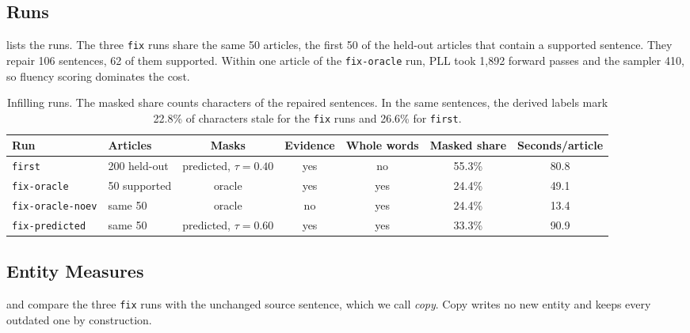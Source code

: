 \documentclass[]{paper}
\begin{document}
\subsection{Runs}

 lists the runs. The three \texttt{fix} runs share the same 50 articles, the first 50 of the held-out articles that contain a supported sentence. They repair 106 sentences, 62 of them supported. Within one article of the \texttt{fix-oracle} run, PLL took 1,892 forward passes and the sampler 410, so fluency scoring dominates the cost.

\begin{table}[t]
\caption{Infilling runs. The masked share counts characters of the repaired sentences. In the same sentences, the derived labels mark 22.8\% of characters stale for the \texttt{fix} runs and 26.6\% for \texttt{first}.}
\label{tab:runs}
\centering
\footnotesize
\setlength{\tabcolsep}{4pt}
\begin{tabular}{llccccc}
\toprule
Run & Articles & Masks & Evidence & Whole words & Masked share & Seconds/article \\
\midrule
\texttt{first} & 200 held-out & predicted, $\tau = 0.40$ & yes & no & 55.3\% & 80.8 \\
\texttt{fix-oracle} & 50 supported & oracle & yes & yes & 24.4\% & 49.1 \\
\texttt{fix-oracle-noev} & same 50 & oracle & no & yes & 24.4\% & 13.4 \\
\texttt{fix-predicted} & same 50 & predicted, $\tau = 0.60$ & yes & yes & 33.3\% & 90.9 \\
\bottomrule
\end{tabular}
\end{table}

\subsection{Entity Measures}

 and  compare the three \texttt{fix} runs with the unchanged source sentence, which we call \emph{copy}. Copy writes no new entity and keeps every outdated one by construction.
\end{document}
